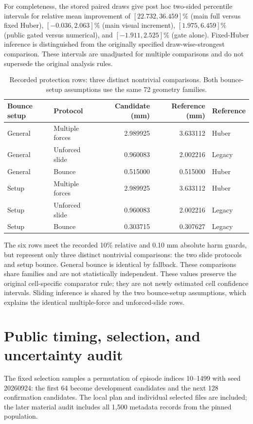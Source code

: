 \documentclass[11pt]{article}
\begin{document}
For completeness, the stored paired draws give post hoc two-sided percentile intervals for relative mean improvement of $[22.732,36.459]\%$ (main full versus fixed Huber), $[-0.036,2.063]\%$ (main visual increment), $[1.975,6.459]\%$ (public gated versus numerical), and $[-1.911,2.525]\%$ (gate alone). Fixed-Huber inference is distinguished from the originally specified draw-wise-strongest comparison. These intervals are unadjusted for multiple comparisons and do not supersede the original analysis rules.
\begin{table}[h]\centering\small
\caption{Recorded protection rows: three distinct nontrivial comparisons. Both bounce-setup assumptions use the same 72 geometry families.}
\begin{tabular}{llrrl}\toprule Bounce setup & Protocol & Candidate (mm) & Reference (mm) & Reference\\\midrule
General & Multiple forces & 2.989925 & 3.633112 & Huber\\
General & Unforced slide & 0.960083 & 2.002216 & Legacy\\
General & Bounce & 0.515000 & 0.515000 & Huber\\
Setup & Multiple forces & 2.989925 & 3.633112 & Huber\\
Setup & Unforced slide & 0.960083 & 2.002216 & Legacy\\
Setup & Bounce & 0.303715 & 0.307627 & Legacy\\\bottomrule
\end{tabular}\end{table}
The six rows meet the recorded 10\% relative and 0.10 mm absolute harm guards, but represent only three distinct nontrivial comparisons: the two slide protocols and setup bounce. General bounce is identical by fallback. These comparisons share families and are not statistically independent. These values preserve the original cell-specific comparator rule; they are not newly estimated cell confidence intervals. Sliding inference is shared by the two bounce-setup assumptions, which explains the identical multiple-force and unforced-slide rows.

\section{Public timing, selection, and uncertainty audit}
The fixed selection samples a permutation of episode indices 10--1499 with seed 20260924: the first 64 become development candidates and the next 128 confirmation candidates. The local plan and individual selected files are included; the later material audit includes all 1,500 metadata records from the pinned population.
\end{document}
